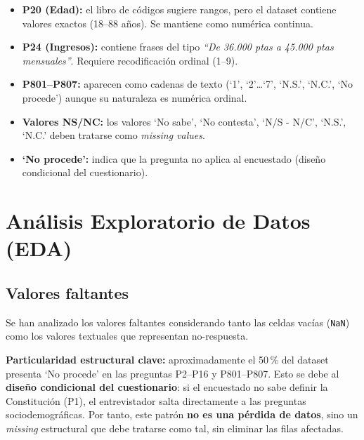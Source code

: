 \documentclass[12pt,a4paper]{article}
\begin{document}
\begin{itemize}[leftmargin=1.5em]
  \item \textbf{P20 (Edad):} el libro de códigos sugiere rangos, pero el dataset contiene valores exactos (18--88 años). Se mantiene como numérica continua.
  \item \textbf{P24 (Ingresos):} contiene frases del tipo \textit{``De 36.000 ptas a 45.000 ptas mensuales''}. Requiere recodificación ordinal (1--9).
  \item \textbf{P801--P807:} aparecen como cadenas de texto (`1', `2'\ldots `7', `N.S.', `N.C.', `No procede') aunque su naturaleza es numérica ordinal.
  \item \textbf{Valores NS/NC:} los valores `No sabe', `No contesta', `N/S - N/C', `N.S.', `N.C.' deben tratarse como \textit{missing values}.
  \item \textbf{`No procede':} indica que la pregunta no aplica al encuestado (diseño condicional del cuestionario).
\end{itemize}

\newpage

\section{Análisis Exploratorio de Datos (EDA)}

\subsection{Valores faltantes}

Se han analizado los valores faltantes considerando tanto las celdas vacías (\texttt{NaN}) como los valores textuales que representan no-respuesta.

\begin{notebox}
\textbf{Particularidad estructural clave:} aproximadamente el 50\,\% del dataset presenta `No procede' en las preguntas P2--P16 y P801--P807. Esto se debe al \textbf{diseño condicional del cuestionario}: si el encuestado no sabe definir la Constitución (P1), el entrevistador salta directamente a las preguntas sociodemográficas. Por tanto, este patrón \textbf{no es una pérdida de datos}, sino un \textit{missing} estructural que debe tratarse como tal, sin eliminar las filas afectadas.
\end{notebox}
\end{document}
